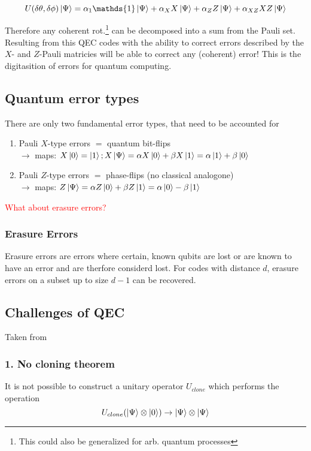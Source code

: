 \begin{equation}
    U(\delta \theta, \delta \phi)\ket{\Psi} = 
    \alpha_1 \mathds{1} \ket{\Psi} +
    \alpha_X X \ket{\Psi}+
    \alpha_Z Z \ket{\Psi}+
    \alpha_{XZ} XZ \ket{\Psi}
\end{equation}

Therefore any coherent rot.\footnote{This could also be generalized for arb. quantum processes} can be decomposed into a sum from the Pauli set. 
Resulting from this QEC codes with the ability to correct errors described by the $X$- and $Z$-Pauli matricies will be able to correct any (coherent) error!
This is the digitasition of errors for quantum computing. \cite{QECintro}


\subsection{Quantum error types}
There are only two fundamental error types, that need to be accounted for \cite{QECintro}

\begin{enumerate}
    \item Pauli $X$-type errors $=$ quantum bit-flips \\
    $\rightarrow$ maps: $X\ket{0} = \ket{1}; X \ket{\Psi}= \alpha X \ket{0} + \beta X \ket{1} = \alpha  \ket{1} + \beta \ket{0}   $
    \item Pauli $Z$-type errors $=$ phase-flips (no classical analogone)\\
    $\rightarrow$ maps:  $Z \ket{\Psi}= \alpha Z \ket{0} + \beta Z \ket{1} = \alpha  \ket{0} - \beta \ket{1}   $
\end{enumerate}
\textcolor{red}{What about erasure errors?}


\subsubsection{Erasure Errors}
Erasure errors are errors where certain, known qubits are lost or are known to have an error and are therfore considerd lost. 
For codes with distance $d$, erasure errors on a subset up to size $d-1$ can be recovered. \cite{QECmemory}


\subsection{Challenges of QEC}
Taken from \cite{QECintro}


\subsubsection{1. No cloning theorem}
It is not possible to construct a unitary operator $U_{clone}$ which performs the operation
\begin{equation}
    U_{clone}(\ket{\Psi} \otimes \ket{0}) \rightarrow \ket{\Psi} \otimes\ket{\Psi}
\end{equation}



